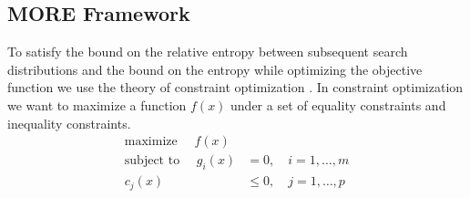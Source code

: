 \subsection{MORE Framework}
To satisfy the bound on the relative entropy between subsequent
search distributions and the bound on the entropy while
optimizing the objective function
we use the theory of constraint optimization \citep{boyd2004convex}.
In constraint optimization we want to maximize a function
$f(x)$ under a set of equality constraints and inequality constraints.
\begin{equation}
  \label{eq:constraint}
  \begin{aligned}
    \text{maximize } \quad f(x)& \\
    \text{subject to } \quad g_i(x)& = 0, \quad i = 1, \dots, m\\
    c_j(x)& \leq 0, \quad j = 1, \dots, p
  \end{aligned}                       
\end{equation}

